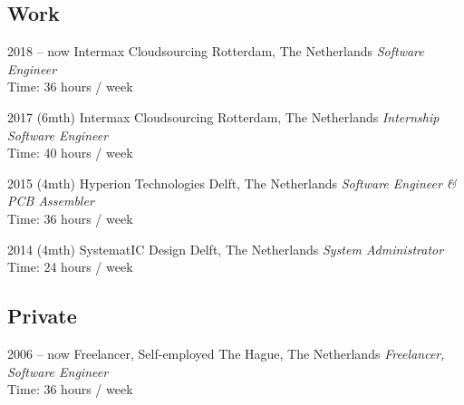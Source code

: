 \documentclass[]{friggeri-cv}
\begin{document}
\subsection{Work}

\begin{entrylist}


\entry
{2018 -- now}
{Intermax Cloudsourcing}
{Rotterdam, The Netherlands}
{\emph{Software Engineer} \\
Time: 36 hours / week}


\entry
{2017 (6mth)}
{Intermax Cloudsourcing}
{Rotterdam, The Netherlands}
{\emph{Internship Software Engineer} \\
Time: 40 hours / week}


\entry
{2015 (4mth)}
{Hyperion Technologies}
{Delft, The Netherlands}
{\emph{Software Engineer \& PCB Assembler} \\
Time: 36 hours / week}


\entry
{2014 (4mth)}
{SystematIC Design}
{Delft, The Netherlands}
{\emph{System Administrator} \\
Time: 24 hours / week}


\end{entrylist}

\subsection{Private}

\begin{entrylist}


\entry
{2006 -- now}
{Freelancer, Self-employed}
{The Hague, The Netherlands}
{\emph{Freelancer, Software Engineer} \\
Time: 36 hours / week}


\end{entrylist}

\newpage{}

\end{document}
